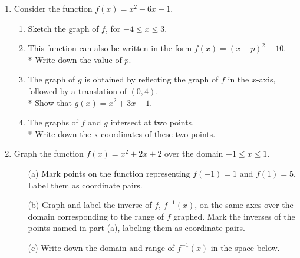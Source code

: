 \documentclass[12pt, oneside]{article}
\begin{document}
\begin{enumerate}
    \item Consider the function $f(x)=x^2-6x-1$.
    \begin{enumerate}
        \item Sketch the graph of $f$, for $-4 \leq x \leq 3$.
        \item This function can also be written in the form $f(x)=(x-p)^2 -10$.\\*
        Write down the value of $p$.
        \item The graph of $g$ is obtained by reflecting the graph of $f$ in the $x$-axis, followed by a translation of $(0, 4)$.\\* Show that $g(x)=x^2+3x-1$.
        \item The graphs of $f$ and $g$ intersect at two points.\\*
        Write down the x-coordinates of these two points.
    \end{enumerate}

\newpage
    \item Graph the function $f(x)=x^2+2x+2$ over the domain $-1 \leq x\leq 1$.
    \begin{itemize}
        \item[(a)] Mark points on the function representing $f(-1)=1$ and $f(1)=5$. Label them as coordinate pairs.
    	\item[(b)] Graph and label the inverse of $f$, $f^{-1}(x)$, on the same axes over the domain corresponding to the range of $f$ graphed. Mark the inverses of the points named in part (a), labeling them as coordinate pairs.
    	\item[(c)] Write down the domain and range of $f^{-1}(x)$ in the space below. \vspace{2cm}
    \end{itemize}


  \end{enumerate}
\end{document}
